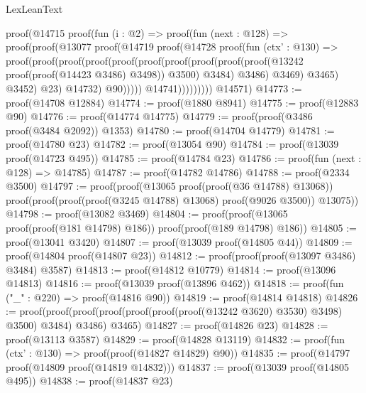 \begin{lexlean}{LexLeanText}
\begin{coremodule}
                  proof(@14715
                      proof(fun (i : @2) =>
                        proof(fun (next : @128) =>
                          proof(proof(@13077
                                proof(@14719
                                    proof(@14728
                                        proof(fun (ctx' : @130) =>
                                          proof(proof(proof(proof(proof(proof(proof(proof(proof(proof(@13242
                                                                proof(proof(@14423 @3486) @3498))
                                                              @3500)
                                                            @3484)
                                                          @3486)
                                                        @3469)
                                                      @3465)
                                                    @3452)
                                                  @23)
                                                @14732)
                                              @90)))))
                              @14741)))))))))
      @14571)
@14773 := proof(@14708 @12884)
@14774 := proof(@1880 @8941)
@14775 := proof(@12883 @90)
@14776 := proof(@14774 @14775)
@14779 := proof(proof(@3486 proof(@3484 @2092)) @1353)
@14780 := proof(@14704 @14779)
@14781 := proof(@14780 @23)
@14782 := proof(@13054 @90)
@14784 := proof(@13039 proof(@14723 @495))
@14785 := proof(@14784 @23)
@14786 := proof(fun (next : @128) => @14785)
@14787 := proof(@14782 @14786)
@14788 := proof(@2334 @3500)
@14797 := proof(proof(@13065 proof(proof(@36 @14788) @13068))
      proof(proof(proof(proof(@3245 @14788) @13068) proof(@9026 @3500)) @13075))
@14798 := proof(@13082 @3469)
@14804 := proof(proof(@13065 proof(proof(@181 @14798) @186)) proof(proof(@189 @14798) @186))
@14805 := proof(@13041 @3420)
@14807 := proof(@13039 proof(@14805 @44))
@14809 := proof(@14804 proof(@14807 @23))
@14812 := proof(proof(proof(@13097 @3486) @3484) @3587)
@14813 := proof(@14812 @10779)
@14814 := proof(@13096 @14813)
@14816 := proof(@13039 proof(@13896 @462))
@14818 := proof(fun ("_" : @220) => proof(@14816 @90))
@14819 := proof(@14814 @14818)
@14826 := proof(proof(proof(proof(proof(proof(proof(@13242 @3620) @3530) @3498) @3500) @3484) @3486)
      @3465)
@14827 := proof(@14826 @23)
@14828 := proof(@13113 @3587)
@14829 := proof(@14828 @13119)
@14832 := proof(fun (ctx' : @130) => proof(proof(@14827 @14829) @90))
@14835 := proof(@14797 proof(@14809 proof(@14819 @14832)))
@14837 := proof(@13039 proof(@14805 @495))
@14838 := proof(@14837 @23)

\end{coremodule}
\end{lexlean}
